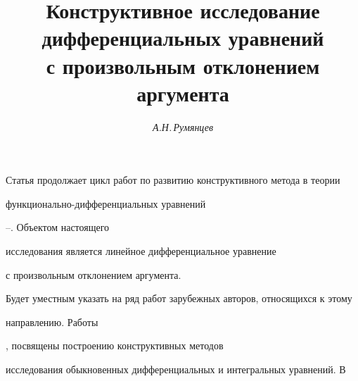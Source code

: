 

\author{\it А.Н.\,Румянцев} 


\title{Конструктивное исследование\\


дифференциальных уравнений\\


с произвольным отклонением аргумента}


 




\date{} 




 


\pagestyle{plain} %


 


 




 


\maketitle 


 




 


Статья продолжает цикл работ по развитию конструктивного метода в теории


функциональ\-но-дифференциальных уравнений


\cite{Az}--\cite{Mak2}. Объектом настоящего


исследования является линейное дифференциальное уравнение


с произвольным отклонением аргумента.





Будет уместным указать на ряд работ зарубежных авторов, относящихся к этому


направлению. Работы


\cite{Kau1}, \cite{Kau2} посвящены построению конструктивных методов


исследования обыкновенных дифференциальных и интегральных уравнений. В


